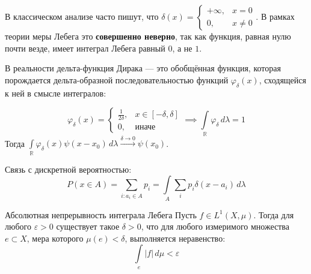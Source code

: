 \documentclass[12pt,a4paper]{article}
\begin{document}
\begin{Example}
В классическом анализе часто пишут, что $\delta(x) = \begin{cases} +\infty, & x=0 \\ 0, & x \ne 0 \end{cases}$. 
В рамках теории меры Лебега это \textbf{совершенно неверно}, так как функция, равная нулю почти везде, имеет интеграл Лебега равный $0$, а не $1$.

В реальности дельта-функция Дирака — это обобщённая функция, которая порождается дельта-образной последовательностью функций $\varphi_\delta(x)$, сходящейся к ней в смысле интегралов:
\begin{center}
\end{center}
$$ \varphi_\delta(x) = \begin{cases} \frac{1}{2\delta}, & x \in [-\delta, \delta] \\ 0, & \text{иначе} \end{cases} \implies \int\limits_{\mathbb{R}} \varphi_\delta \, d\lambda = 1 $$
Тогда $\int\limits_{\mathbb{R}} \varphi_\delta(x) \psi(x-x_0) \, d\lambda \xrightarrow{\delta \to 0} \psi(x_0)$. 

Связь с дискретной вероятностью: 
$$ P(x \in A) = \sum\limits_{i: a_i \in A} p_i = \int\limits_A \sum\limits_{i} p_i \delta(x - a_i) \, d\lambda $$
\end{Example}

\begin{Lemma}{Абсолютная непрерывность интеграла Лебега}{}
Пусть $f \in L^1(X, \mu)$. Тогда для любого $\varepsilon > 0$ существует такое $\delta > 0$, что для любого измеримого множества $e \subset X$, мера которого $\mu(e) < \delta$, выполняется неравенство:
$$ \int\limits_e |f| \, d\mu < \varepsilon $$
\end{Lemma}
\end{document}
